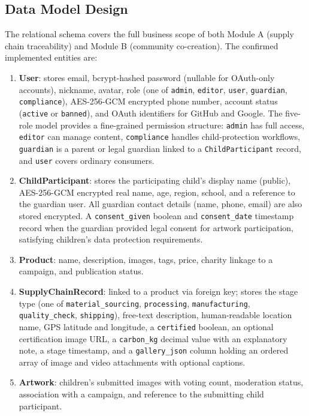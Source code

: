 \documentclass[11pt]{article}
\begin{document}
\subsection{Data Model Design}
The relational schema covers the full business scope of both Module A (supply chain traceability) and Module B (community co-creation). The confirmed implemented entities are:

\begin{enumerate}[leftmargin=2.2em]
    \item \textbf{User}: stores email, bcrypt-hashed password (nullable for OAuth-only accounts), nickname, avatar, role (one of \texttt{admin}, \texttt{editor}, \texttt{user}, \texttt{guardian}, \texttt{compliance}), AES-256-GCM encrypted phone number, account status (\texttt{active} or \texttt{banned}), and OAuth identifiers for GitHub and Google. The five-role model provides a fine-grained permission structure: \texttt{admin} has full access, \texttt{editor} can manage content, \texttt{compliance} handles child-protection workflows, \texttt{guardian} is a parent or legal guardian linked to a \texttt{ChildParticipant} record, and \texttt{user} covers ordinary consumers.
    \item \textbf{ChildParticipant}: stores the participating child's display name (public), AES-256-GCM encrypted real name, age, region, school, and a reference to the guardian user. All guardian contact details (name, phone, email) are also stored encrypted. A \texttt{consent\_given} boolean and \texttt{consent\_date} timestamp record when the guardian provided legal consent for artwork participation, satisfying children's data protection requirements.
    \item \textbf{Product}: name, description, images, tags, price, charity linkage to a campaign, and publication status.
    \item \textbf{SupplyChainRecord}: linked to a product via foreign key; stores the stage type (one of \texttt{material\_sourcing}, \texttt{processing}, \texttt{manufacturing}, \texttt{quality\_check}, \texttt{shipping}), free-text description, human-readable location name, GPS latitude and longitude, a \texttt{certified} boolean, an optional certification image URL, a \texttt{carbon\_kg} decimal value with an explanatory note, a stage timestamp, and a \texttt{gallery\_json} column holding an ordered array of image and video attachments with optional captions.
    \item \textbf{Artwork}: children's submitted images with voting count, moderation status, association with a campaign, and reference to the submitting child participant.

\end{enumerate}
\end{document}
